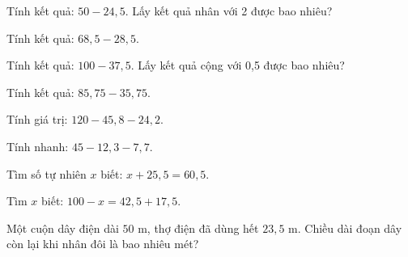 
\begin{ex}
  Tính kết quả: $50 - 24{,}5$. Lấy kết quả nhân với 2 được bao nhiêu?
\end{ex}

\begin{ex}
  Tính kết quả: $68{,}5 - 28{,}5$.
\end{ex}

\begin{ex}
  Tính kết quả: $100 - 37{,}5$. Lấy kết quả cộng với 0,5 được bao nhiêu?
\end{ex}

\begin{ex}
  Tính kết quả: $85{,}75 - 35{,}75$.
\end{ex}

\begin{ex}
  Tính giá trị: $120 - 45{,}8 - 24{,}2$.
\end{ex}

\begin{ex}
  Tính nhanh: $45 - 12{,}3 - 7{,}7$.
\end{ex}

\begin{ex}
  Tìm số tự nhiên $x$ biết: $x + 25{,}5 = 60{,}5$.
\end{ex}

\begin{ex}
  Tìm $x$ biết: $100 - x = 42{,}5 + 17{,}5$.
\end{ex}

\begin{ex}
  Một cuộn dây điện dài $50\text{ m}$, thợ điện đã dùng hết $23{,}5\text{ m}$. Chiều dài đoạn dây còn lại khi nhân đôi là bao nhiêu mét?
\end{ex}

